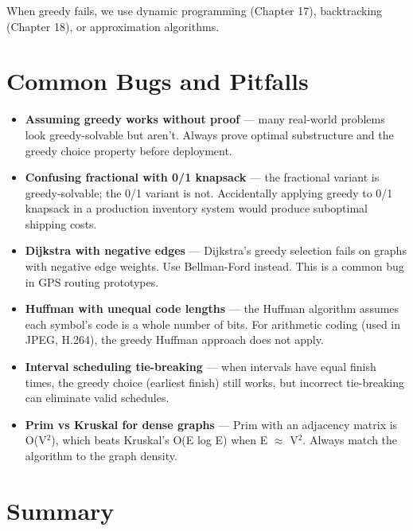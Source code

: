 When greedy fails, we use dynamic programming (Chapter 17), backtracking (Chapter 18), or approximation algorithms.

\section{Common Bugs and Pitfalls}

\begin{itemize}
\item \textbf{Assuming greedy works without proof} — many real-world problems look greedy-solvable but aren't. Always prove optimal substructure and the greedy choice property before deployment.
\item \textbf{Confusing fractional with 0/1 knapsack} — the fractional variant is greedy-solvable; the 0/1 variant is not. Accidentally applying greedy to 0/1 knapsack in a production inventory system would produce suboptimal shipping costs.
\item \textbf{Dijkstra with negative edges} — Dijkstra's greedy selection fails on graphs with negative edge weights. Use Bellman-Ford instead. This is a common bug in GPS routing prototypes.
\item \textbf{Huffman with unequal code lengths} — the Huffman algorithm assumes each symbol's code is a whole number of bits. For arithmetic coding (used in JPEG, H.264), the greedy Huffman approach does not apply.
\item \textbf{Interval scheduling tie-breaking} — when intervals have equal finish times, the greedy choice (earliest finish) still works, but incorrect tie-breaking can eliminate valid schedules.
\item \textbf{Prim vs Kruskal for dense graphs} — Prim with an adjacency matrix is O(V$^{2}$), which beats Kruskal's O(E log E) when E $\approx$ V$^{2}$. Always match the algorithm to the graph density.
\end{itemize}

\section{Summary}

